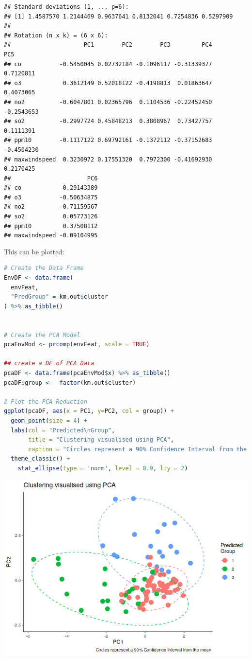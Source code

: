 \documentclass[
]{article}
\begin{document}
\begin{lstlisting}
## Standard deviations (1, .., p=6):
## [1] 1.4587570 1.2144469 0.9637641 0.8132041 0.7254836 0.5297909
## 
## Rotation (n x k) = (6 x 6):
##                     PC1        PC2        PC3         PC4        PC5
## co           -0.5450045 0.02732184 -0.1096117 -0.31339377  0.7120811
## o3            0.3612149 0.52018122 -0.4198813  0.01863647  0.4073065
## no2          -0.6047801 0.02365796  0.1104536 -0.22452450 -0.2543653
## so2          -0.2997724 0.45848213  0.3808967  0.73427757  0.1111391
## ppm10        -0.1117122 0.69792161 -0.1372112 -0.37152683 -0.4504230
## maxwindspeed  0.3230972 0.17551320  0.7972300 -0.41692930  0.2170425
##                      PC6
## co            0.29143389
## o3           -0.50634875
## no2          -0.71159567
## so2           0.05773126
## ppm10         0.37508112
## maxwindspeed -0.09104995
\end{lstlisting}

This can be plotted:

\begin{lstlisting}[language=R]
# Create the Data Frame
EnvDF <- data.frame(
  envFeat,
  "PredGroup" = km.out$cluster
) %>% as_tibble()


# Create the PCA Model
pcaEnvMod <- prcomp(envFeat, scale = TRUE)

## create a DF of PCA Data
pcaDF <- data.frame(pcaEnvMod$x) %>% as_tibble()
pcaDF$group <-  factor(km.out$cluster)

# Plot the PCA Reduction
ggplot(pcaDF, aes(x = PC1, y=PC2, col = group)) +
  geom_point(size = 4) +
  labs(col = "Predicted\nGroup",
       title = "Clustering visualised using PCA",
       caption = "Circles represent a 90% Confidence Interval from the mean ") +
  theme_classic() +
    stat_ellipse(type = 'norm', level = 0.9, lty = 2) 
\end{lstlisting}

\includegraphics{FinalExam_files/figure-html/unnamed-chunk-10-1.png}
\end{document}
